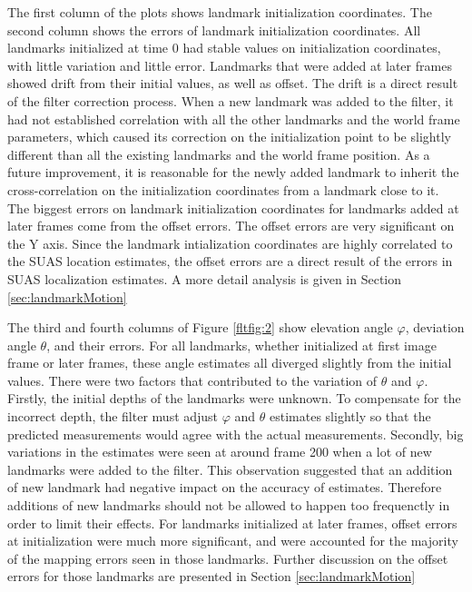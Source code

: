 The first column of the plots shows landmark initialization coordinates.
The second column shows the errors of landmark initialization coordinates.
All landmarks initialized at time 0 had stable values on
initialization coordinates, with little variation and little error.
Landmarks that were added at later frames showed drift from their
initial values, as well as offset. The drift is a direct result of the
filter correction process. When a new landmark was added to the
filter, it had not established correlation with all the other
landmarks and the world frame parameters, which caused its correction
on the initialization point to be slightly different than all the existing
landmarks and the world frame position. As a future improvement, it is
reasonable for the newly added landmark to inherit the
cross-correlation on the initialization coordinates from a landmark
close to it. The biggest errors on landmark initialization
coordinates for landmarks added at later frames come from the offset
errors. The offset errors are very significant on the Y axis.
Since the landmark intialization coordinates are highly
correlated to the SUAS location estimates, the offset errors are a
direct result of the errors in SUAS localization estimates. A more detail
analysis is given in Section \ref{sec:landmarkMotion}

The third and fourth columns of Figure \ref{fltfig:2} show elevation
angle $\varphi$, deviation angle $\theta$, and their errors. For all
landmarks, whether initialized at first image frame or later frames,
these angle estimates all diverged slightly from the initial values.
There were two factors that contributed to the variation of $\theta$
and $\varphi$. Firstly, the initial depths of the landmarks were
unknown. To compensate for the incorrect depth, the filter must adjust
$\varphi$ and $\theta$ estimates slightly so that the predicted
measurements would agree with the actual measurements. Secondly, big
variations in the estimates were seen at around frame 200 when a lot
of new landmarks were added to the filter. This observation suggested
that an addition of new landmark had negative impact on the accuracy of
estimates. Therefore additions of new landmarks should not be allowed
to happen too frequenctly in order to limit their effects. For
landmarks initialized at later frames, offset errors at initialization
were much more significant, and were accounted for the majority of the
mapping errors seen in those landmarks. Further discussion on the offset
errors for those landmarks are presented in Section
\ref{sec:landmarkMotion}

